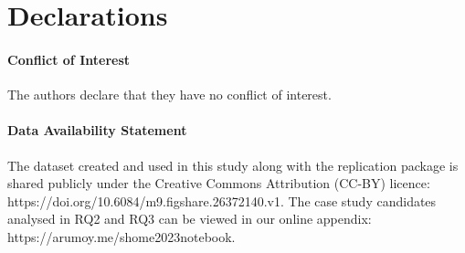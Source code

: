 \documentclass[smallextended]{svjour3}       %
\begin{document}
\section{Declarations}

\paragraph{\textbf{Conflict of Interest}} The authors declare that they have no
conflict of interest.

\paragraph{\textbf{Data Availability Statement}} The dataset created and used
in this study along with the replication package is shared publicly
under the Creative Commons Attribution (CC-BY) licence:
https://doi.org/10.6084/m9.figshare.26372140.v1. The case study
candidates analysed in RQ2 and RQ3 can be viewed in our online
appendix: https://arumoy.me/shome2023notebook.

\end{document}
